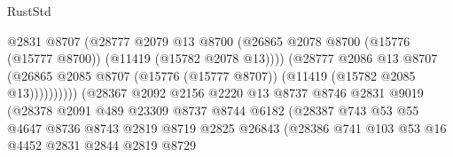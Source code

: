 \begin{lexlean}{RustStd}
\begin{coremodule}
                                          @2831
                                          @8707
                                          (@28777
                                            @2079
                                            @13
                                            @8700
                                            (@26865
                                              @2078
                                              @8700
                                              (@15776 (@15777 @8700))
                                              (@11419 (@15782 @2078 @13))))
                                          (@28777
                                            @2086
                                            @13
                                            @8707
                                            (@26865
                                              @2085
                                              @8707
                                              (@15776 (@15777 @8707))
                                              (@11419 (@15782 @2085 @13))))))))))
                              (@28367
                                @2092
                                @2156
                                @2220
                                @13
                                @8737
                                @8746
                                @2831
                                @9019
                                (@28378
                                  @2091
                                  @489
                                  @23309
                                  @8737
                                  @8744
                                  @6182
                                  (@28387
                                    @743
                                    @53
                                    @55
                                    @4647
                                    @8736
                                    @8743
                                    @2819
                                    @8719
                                    @2825
                                    @26843
                                    (@28386
                                      @741
                                      @103
                                      @53
                                      @16
                                      @4452
                                      @2831
                                      @2844
                                      @2819
                                      @8729

\end{coremodule}
\end{lexlean}
